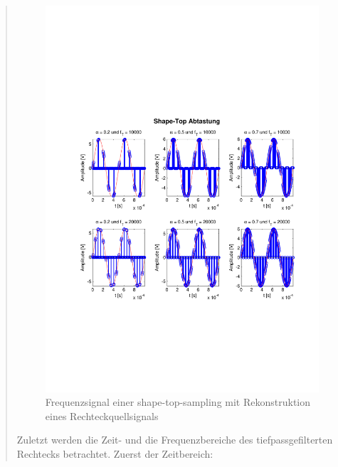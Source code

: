 \begin{quote}
    	
    	\begin{figure}[H]
    \centering
        \includegraphics[scale=0.7, trim = 0cm 0cm 0cm 0cm,
        clip]{./Bilder/shape-top-zeit_3V}
            \caption{Frequenzsignal einer shape-top-sampling mit Rekonstruktion
            eines Rechteckquellsignals}
  	    \end{figure}
  	    
    
    
    	Zuletzt werden die Zeit- und die Frequenzbereiche des tiefpassgefilterten
    	Rechtecks betrachtet. Zuerst der Zeitbereich:
    	

\end{quote}
